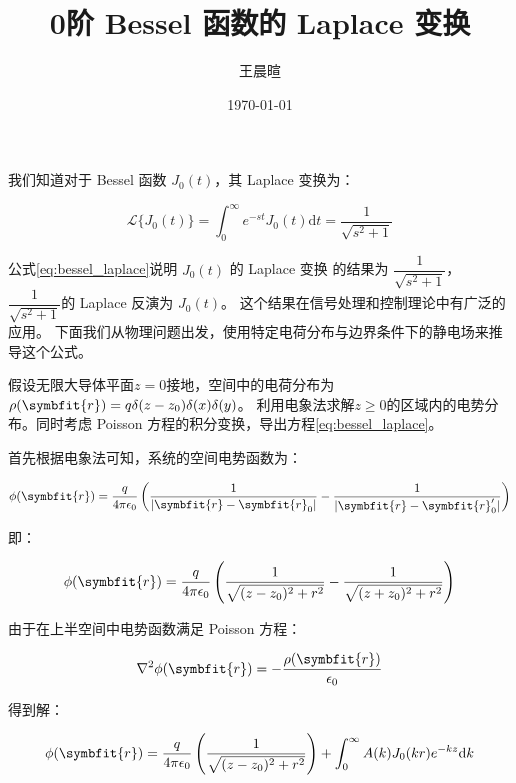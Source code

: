 \documentclass[11pt,a4paper]{ctexart}
\title{0阶 Bessel 函数的 Laplace 变换}
\author{王晨暄}
\date{\today}
\newcommand{\dd}{\mathrm{d}}
\begin{document}
\maketitle

\begin{block}

我们知道对于 Bessel 函数 $J_0(t)$，其 Laplace 变换为：

\begin{equation}
    \mathcal{L}\{J_0(t)\} = \int_0^\infty e^{-st} J_0(t) \dd{t} = \frac{1}{\sqrt{s^2 + 1}}
    \label{eq:bessel_laplace}
\end{equation}

公式\eqref{eq:bessel_laplace}说明 $J_0(t)$ 的 Laplace 变换
的结果为 $\dfrac{1}{\sqrt{s^2 + 1}}$，$\dfrac{1}{\sqrt{s^2 + 1}}$的 Laplace 反演为 $J_0(t)$。
这个结果在信号处理和控制理论中有广泛的应用。
下面我们从物理问题出发，使用特定电荷分布与边界条件下的静电场来推导这个公式。

\end{block}

\bigskip

{\kaishu
    假设无限大导体平面$z=0$接地，空间中的电荷分布为$\rho(\symbfit{r})=q\delta(z-z_0)\delta(x)\delta(y)$。
    利用电象法求解$z\geq 0$的区域内的电势分布。同时考虑 Poisson 方程的积分变换，导出方程\eqref{eq:bessel_laplace}。
}

\bigskip

首先根据电象法可知，系统的空间电势函数为：

\begin{equation}
    \phi(\symbfit{r}) = \frac{q}{4\pi\epsilon_0}\left(\frac{1}{|\symbfit{r}-\symbfit{r}_0|} - \frac{1}{|\symbfit{r}-\symbfit{r}_0'|}\right)
    \label{eq:potential}
\end{equation}

即：

\begin{equation}
    \phi(\symbfit{r}) = \frac{q}{4\pi\epsilon_0}\left(\frac{1}{\sqrt{(z-z_0)^2 + r^2}} - \frac{1}{\sqrt{(z+z_0)^2 + r^2}}\right)
    \label{eq:potential_explicit}
\end{equation}

由于在上半空间中电势函数满足 Poisson 方程：

\begin{equation}
    \nabla^2 \phi(\symbfit{r}) = -\frac{\rho(\symbfit{r})}{\epsilon_0}
\end{equation}

得到解：

\begin{equation}
    \phi(\symbfit{r}) = \frac{q}{4\pi\epsilon_0}\left(\frac{1}{\sqrt{(z-z_0)^2 + r^2}}\right) + \int_{0}^{\infty}A(k)J_0(kr)e^{-kz}\dd{k}
    \label{eq:potential_solution}
\end{equation}
\end{document}
